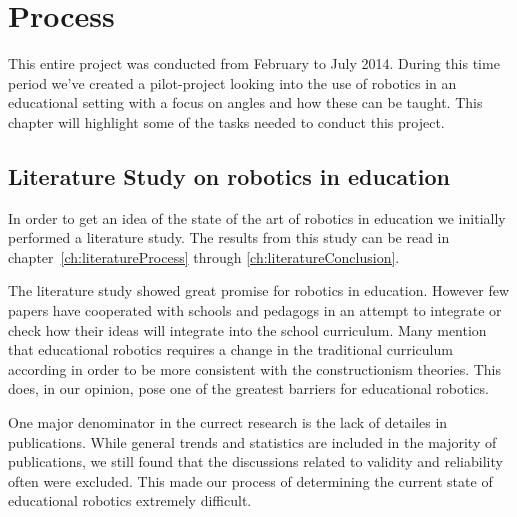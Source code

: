 \chapter{Process}
This entire project was conducted from February to July 2014. During this time period we've created a pilot-project looking into the use of robotics in an educational setting with a focus on angles and how these can be taught.
This chapter will highlight some of the tasks needed to conduct this project. 

\section{Literature Study on robotics in education}
In order to get an idea of the state of the art of robotics in education we initially performed a literature study. The results from this study can be read in chapter~\ref{ch:literatureProcess} through \ref{ch:literatureConclusion}.

\bigskip\noindent
The literature study showed great promise for robotics in education. However few papers have cooperated with schools and pedagogs in an attempt to integrate or check how their ideas will integrate into the school curriculum. Many mention that educational robotics requires a change in the traditional curriculum according in order to be more consistent with the constructionism theories. This does, in our opinion, pose one of the greatest barriers for educational robotics.

\bigskip\noindent
One major denominator in the currect research is the lack of detailes in publications. While general trends and statistics are included in the majority of publications, we still found that the discussions related to validity and reliability often were excluded. This made our process of determining the current state of educational robotics extremely difficult. 


